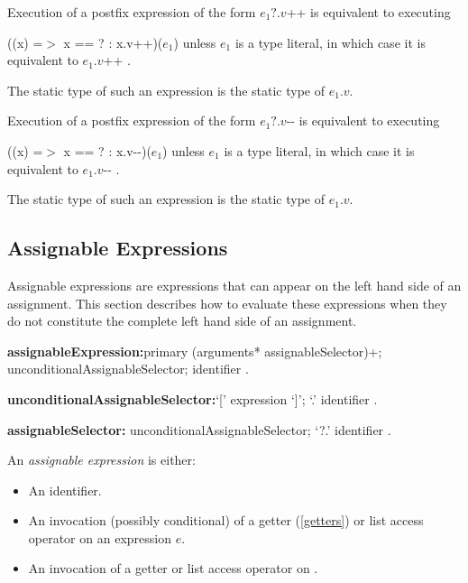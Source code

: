 \documentclass{article}
\newcommand{\code}[1]{{\sf #1}}
\begin{document}
\LMHash{}
Execution of a postfix expression of the form \code{$e_1?.v$++} is equivalent to executing

\code{((x) =$>$ x == \NULL? \NULL : x.v++)($e_1$)}
unless $e_1$ is a type literal, in which case it is equivalent to \code{$e_1.v$++}
.

\LMHash{}
The static type of such an expression is the static type of $e_1.v$.

\LMHash{}
Execution of a postfix expression of the form \code{$e_1?.v$-{}-} is equivalent to executing

\code{((x) =$>$ x == \NULL? \NULL : x.v-{}-)($e_1$)}
unless $e_1$ is a type literal, in which case it is equivalent to \code{$e_1.v$-{}-}
.

\LMHash{}
The static type of such an expression is the static type of $e_1.v$.


\subsection{ Assignable Expressions}

\LMHash{}
Assignable expressions are expressions that can appear on the left hand side of an assignment.
This section describes how to evaluate these expressions when they do not constitute the complete left hand side of an assignment.




\begin{grammar}

{\bf assignableExpression:}primary (arguments* assignableSelector)+;
      \SUPER{} unconditionalAssignableSelector;
      identifier
    .

{\bf unconditionalAssignableSelector:}`[' expression `]'; %
         `{\escapegrammar .}' identifier
    .

{\bf assignableSelector:}
         unconditionalAssignableSelector;
         `{\escapegrammar ?.}' identifier
    .

\end{grammar}


\LMHash{}
An {\em assignable expression} is either:
\begin{itemize}
 \item An identifier.
\item An invocation (possibly conditional) of a getter (\ref{getters}) or list access operator on an expression $e$.
\item An invocation of a getter or list access operator on  \SUPER{}.
\end{itemize}
\end{document}
